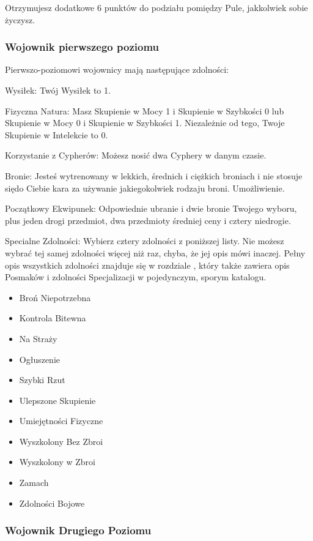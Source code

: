  Otrzymujesz dodatkowe 6 punktów do podziału pomiędzy Pule, jakkolwiek sobie życzysz.
 
\subsubsection{Wojownik pierwszego poziomu}

Pierwszo-poziomowi wojownicy mają następujące zdolności:

Wysiłek: Twój Wysiłek to 1.

Fizyczna Natura: Masz Skupienie w Mocy 1 i Skupienie w Szybkości 0 lub Skupienie w Mocy 0 i Skupienie w Szybkości 1. Niezależnie od tego, Twoje Skupienie w Intelekcie to 0.

Korzystanie z Cypherów: Możesz nosić dwa Cyphery w danym czasie.

Bronie: Jesteś wytrenowany w lekkich, średnich i ciężkich broniach i nie stosuje siędo Ciebie kara za używanie jakiegokolwiek rodzaju broni. Umożliwienie.

Początkowy Ekwipunek: Odpowiednie ubranie i dwie bronie Twojego wyboru, plus jeden drogi przedmiot, dwa przedmioty średniej ceny i cztery niedrogie.

Specialne Zdolności: Wybierz cztery zdolności z poniższej listy. Nie możesz wybrać tej samej zdolności więcej niż raz, chyba, że jej opis mówi inaczej. Pełny opis wszystkich zdolności znajduje się w rozdziale , który także zawiera opis Posmaków i zdolności Specjalizacji w pojedynczym, sporym katalogu.

\begin{itemize}
\item Broń Niepotrzebna
\item Kontrola Bitewna
\item Na Straży
\item Ogłuszenie
\item Szybki Rzut
\item Ulepszone Skupienie
\item Umiejętności Fizyczne
\item Wyszkolony Bez Zbroi
\item Wyszkolony w Zbroi
\item Zamach
\item Zdolności Bojowe
\end{itemize}

\subsubsection{Wojownik Drugiego Poziomu}

